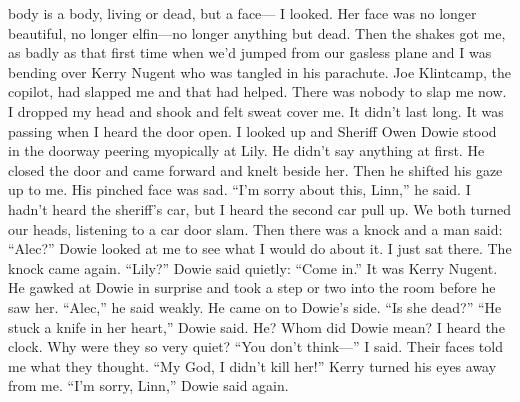 \documentclass{novel}
\begin{document}
body is a body, living or dead, but a face— I looked. Her face was no longer beautiful, no longer elfin—no longer anything but dead. Then the shakes got me, as badly as that first time when we’d jumped from our gasless plane and I was bending over Kerry Nugent who was tangled in his parachute. Joe Klintcamp, the copilot, had slapped me and that had helped. There was nobody to slap me now. I dropped my head and shook and felt sweat cover me. It didn’t last long. It was passing when I heard the door open. I looked up and Sheriff Owen Dowie stood in the doorway peering myopically at Lily. He didn’t say anything at first. He closed the door and came forward and knelt beside her. Then he shifted his gaze up to me. His pinched face was sad. “I’m sorry about this, Linn,” he said. I hadn’t heard the sheriff’s car, but I heard the second car pull up. We both turned our heads, listening to a car door slam. Then there was a knock and a man said: “Alec?” Dowie looked at me to see what I would do about it. I just sat there. The knock came again. “Lily?” Dowie said quietly: “Come in.” It was Kerry Nugent. He gawked at Dowie in surprise and took a step or two into the room before he saw her. “Alec,” he said weakly. He came on to Dowie’s side. “Is she dead?” “He stuck a knife in her heart,” Dowie said. He? Whom did Dowie mean? I heard the clock. Why were they so very quiet? “You don’t think—” I said. Their faces told me what they thought. “My God, I didn’t kill her!” Kerry turned his eyes away from me. “I’m sorry, Linn,” Dowie said again.


\begin{ChapterStart}

\vspace{3\nbs}
\end{ChapterStart}

\end{document}
